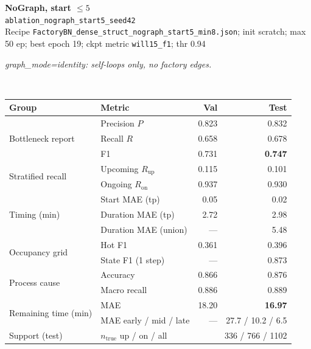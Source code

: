 \documentclass[9pt,a4paper,twocolumn]{extarticle}
\begin{document}
\noindent\begin{minipage}{\columnwidth}
\begin{center}
{\small\bfseries NoGraph, start $\le 5$}\\
{\scriptsize\texttt{ablation\_nograph\_start5\_seed42}}\\
{\scriptsize Recipe \texttt{FactoryBN\_dense\_struct\_nograph\_start5\_min8.json}; init scratch; max 50 ep; best epoch 19; ckpt metric \texttt{will15\_f1}; thr 0.94}\\[1pt]
\parbox{0.96\columnwidth}{\scriptsize\itshape graph\_mode=identity: self-loops only, no factory edges.}\\[2pt]
\scriptsize\setlength{\tabcolsep}{3pt}
\begin{tabular}{llrr}
\toprule
Group & Metric & Val & Test \\
\midrule
\multirow{3}{*}{Bottleneck report}
  & Precision $P$ & 0.823 & 0.832 \\
  & Recall $R$ & 0.658 & 0.678 \\
  & F1 & 0.731 & \textbf{0.747} \\
\midrule
\multirow{2}{*}{Stratified recall}
  & Upcoming $R_{\mathrm{up}}$ & 0.115 & 0.101 \\
  & Ongoing $R_{\mathrm{on}}$ & 0.937 & 0.930 \\
\midrule
\multirow{3}{*}{Timing (min)}
  & Start MAE (tp) & 0.05 & 0.02 \\
  & Duration MAE (tp) & 2.72 & 2.98 \\
  & Duration MAE (union) & --- & 5.48 \\
\midrule
\multirow{2}{*}{Occupancy grid}
  & Hot F1 & 0.361 & 0.396 \\
  & State F1 (1 step) & --- & 0.873 \\
\midrule
\multirow{2}{*}{Process cause}
  & Accuracy & 0.866 & 0.876 \\
  & Macro recall & 0.886 & 0.889 \\
\midrule
\multirow{2}{*}{Remaining time (min)}
  & MAE & 18.20 & \textbf{16.97} \\
  & MAE early / mid / late & --- & 27.7 / 10.2 / 6.5 \\
\midrule
Support (test)
  & $n_{\mathrm{true}}$ up / on / all & \multicolumn{2}{r}{336 / 766 / 1102} \\
\bottomrule
\end{tabular}
\end{center}
\end{minipage}\par\vspace{6pt}
\end{document}
